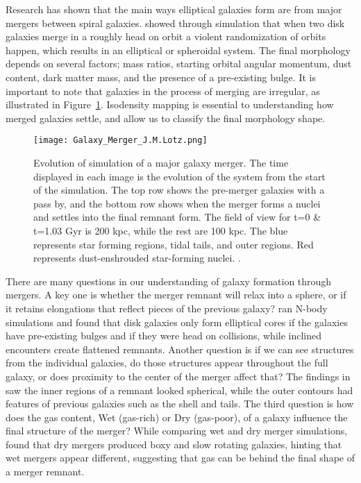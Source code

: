 \documentclass[usenatbib]{mnras}
\begin{document}
Research has shown that the main ways elliptical galaxies form are from major mergers between spiral galaxies. \cite{barnes92} showed through simulation that when two disk galaxies merge in a roughly head on orbit a violent randomization of orbits happen, which results in an elliptical or spheroidal system. The final morphology depends on several factors; mass ratios, starting orbital angular momentum, dust content, dark matter mass, and the presence of a pre-existing bulge. It is important to note that galaxies in the process of merging are irregular, as illustrated in Figure~\ref{fig:morphology}. Isodensity mapping is essential to understanding how merged galaxies settle, and allow us to classify the final morphology shape. 

\begin{figure}[h]
    \centering
    \texttt{[image: Galaxy\_Merger\_J.M.Lotz.png]}
    \caption{Evolution of simulation of a major galaxy merger. The time displayed in each image is the evolution of the system from the start of the simulation. The top row shows the pre-merger galaxies with a pass by, and the bottom row shows when the merger forms a nuclei and settles into the final remnant form. The field of view for t=0 \& t=1.03 Gyr is 200 kpc, while the rest are 100 kpc. The blue represents star forming regions, tidal tails, and outer regions. Red represents dust-enshrouded star-forming nuclei. \citet{lotz08}.}
    \label{fig:morphology}
\end{figure}

There are many questions in our understanding of galaxy formation through mergers. A key one is whether the merger remnant will relax into a sphere, or if it retains elongations that reflect pieces of the previous galaxy? \citet[p. 724-725]{barnes92} ran N-body simulations and found that disk galaxies only form elliptical cores if the galaxies have pre-existing bulges and if they were head on collisions, while inclined encounters create flattened remnants. Another question is if we can see structures from the individual galaxies, do those structures appear throughout the full galaxy, or does proximity to the center of the merger affect that? The findings in \citet[p. 13]{vandermarel12b} saw the inner regions of a remnant looked spherical, while the outer contours had features of previous galaxies such as the shell and tails. The third question is how does the gas content, Wet (gas-rich) or Dry (gas-poor), of a galaxy influence the final structure of the merger? While comparing wet and dry merger simulations,\citep[p. 12]{lin10} found that dry mergers produced boxy and slow rotating galaxies, hinting that wet mergers appear different, suggesting that gas can be behind the final shape of a merger remnant.  
\end{document}
